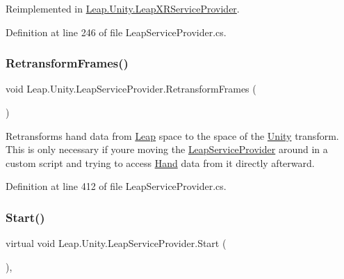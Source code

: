 Reimplemented in \mbox{\hyperlink{class_leap_1_1_unity_1_1_leap_x_r_service_provider_abe79fe929f415f66f157d108b3f27aa5}{Leap.\+Unity.\+Leap\+X\+R\+Service\+Provider}}.



Definition at line 246 of file Leap\+Service\+Provider.\+cs.

\mbox{\label{class_leap_1_1_unity_1_1_leap_service_provider_a8e864272647ed7001524df393505ddf3}} 
\subsubsection{\texorpdfstring{RetransformFrames()}{RetransformFrames()}}
{\footnotesize\ttfamily void Leap.\+Unity.\+Leap\+Service\+Provider.\+Retransform\+Frames (\begin{DoxyParamCaption}{ }\end{DoxyParamCaption})}



Retransforms hand data from \mbox{\hyperlink{namespace_leap_1_1_unity_1_1_leap}{Leap}} space to the space of the \mbox{\hyperlink{namespace_leap_1_1_unity}{Unity}} transform. This is only necessary if you\textquotesingle{}re moving the \mbox{\hyperlink{class_leap_1_1_unity_1_1_leap_service_provider}{Leap\+Service\+Provider}} around in a custom script and trying to access \mbox{\hyperlink{class_leap_1_1_hand}{Hand}} data from it directly afterward. 



Definition at line 412 of file Leap\+Service\+Provider.\+cs.

\mbox{\label{class_leap_1_1_unity_1_1_leap_service_provider_aee7af248182bf0df5767cf27f55ec1ca}} 
\subsubsection{\texorpdfstring{Start()}{Start()}}
{\footnotesize\ttfamily virtual void Leap.\+Unity.\+Leap\+Service\+Provider.\+Start (\begin{DoxyParamCaption}{ }\end{DoxyParamCaption})\hspace{0.3cm}{\ttfamily [protected]}, {\ttfamily [virtual]}}



